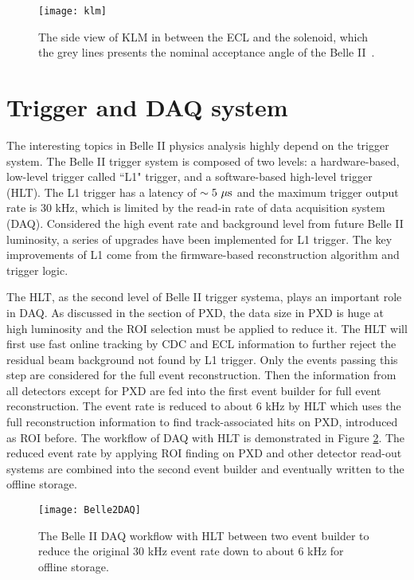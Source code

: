 \begin{figure}[htbp]
	\centering
\texttt{[image: klm]}
\caption{The side view of KLM in between the ECL and the solenoid, which the grey lines presents the nominal acceptance angle of the Belle II~\cite{Abe:2010gxa}. }
\label{fig:klm}
\end{figure}




\section{Trigger and DAQ system}
The interesting topics in Belle II physics analysis highly depend on the trigger system. The Belle II trigger system is composed of two levels: a hardware-based, low-level trigger called ``L1" trigger, and a software-based high-level trigger (HLT). The L1 trigger has a latency of $\sim 5~ \-\mu\text{s}$ and the maximum trigger output rate is 30 kHz, which is limited by the read-in rate of data acquisition system (DAQ). Considered the high event rate and background level from future Belle II luminosity, a series of upgrades have been implemented for L1 trigger. The key improvements of L1 come from the firmware-based reconstruction algorithm and trigger logic.

The HLT, as the second level of Belle II trigger systema, plays an important role in DAQ. As discussed in the section of PXD, the data size in PXD is huge at high luminosity and the ROI selection must be applied to reduce it. The HLT will first use fast online tracking by CDC and ECL information to further reject the residual beam background not found by L1 trigger. Only the events passing this step are considered for the full event reconstruction. Then the information from all detectors except for PXD are fed into the first event builder for full event reconstruction. The event rate is reduced to about $6$ kHz by HLT which uses the full reconstruction information to find track-associated hits on PXD, introduced as ROI before. The workflow of DAQ with HLT is demonstrated in Figure \ref{fig:daq}. The reduced event rate by applying ROI finding on PXD and other detector read-out systems are combined into the second event builder and eventually written to the offline storage. 

\begin{figure}[htbp]
	\centering
	\texttt{[image: Belle2DAQ]}
	\caption{The Belle II DAQ workflow with HLT between two event builder to reduce the original 30 kHz event rate down to about 6 kHz for offline storage.}
	\label{fig:daq}
\end{figure}


